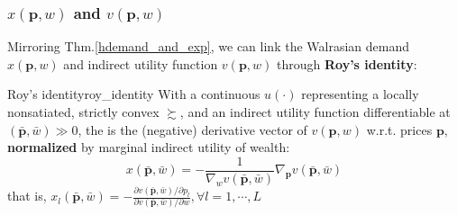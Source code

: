 \subsubsection*{$x(\mathbf{p},w)$ and $v(\mathbf{p},w)$}
Mirroring Thm.\ref{hdemand_and_exp}, we can link the Walrasian demand $x(\mathbf{p},w)$ and indirect utility function $v(\mathbf{p},w)$ through \textbf{Roy's identity}:
\begin{theorem}{Roy's identity}{roy_identity}
    With a continuous $u(\cdot)$ representing a locally nonsatiated, strictly convex $\succsim$, and an indirect utility function differentiable at $(\bar{\mathbf{p}},\bar{w})\gg 0$, the  is the (negative) derivative vector of $v(\mathbf{p},w)$ w.r.t. prices $\mathbf{p}$, \textbf{normalized} by marginal indirect utility of wealth:
    $$x(\bar{\mathbf{p}},\bar{w})=-\frac{1}{\nabla_w v(\bar{\mathbf{p}},\bar{w})}\nabla_{\mathbf{p}}v(\bar{\mathbf{p}},\bar{w})$$
    that is, $x_l(\bar{\mathbf{p}},\bar{w})=- \frac{\partial v(\bar{\mathbf{p}},\bar{w})/\partial p_l}{\partial v(\bar{\mathbf{p}},\bar{w})/\partial w},\forall l=1,\cdots,L$
\end{theorem}

